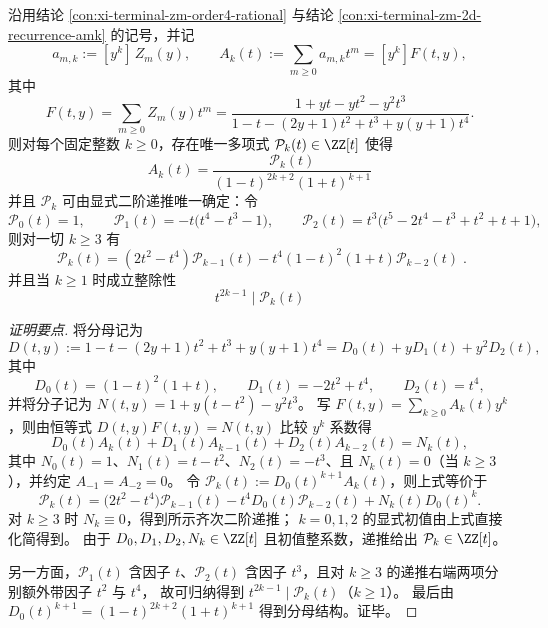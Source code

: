 
\begin{conclusion}\label{con:xi-terminal-zm-fixed-weight-generating-function-rigidity}
沿用结论 \ref{con:xi-terminal-zm-order4-rational} 与结论 \ref{con:xi-terminal-zm-2d-recurrence-amk} 的记号，并记
\[
a_{m,k}:=[y^k]\,Z_m(y),\qquad
A_k(t):=\sum_{m\ge 0}a_{m,k}t^m=[y^k]F(t,y),
\]
其中
\[
F(t,y)=\sum_{m\ge 0}Z_m(y)t^m
=\frac{1+yt-yt^2-y^2t^3}{1-t-(2y+1)t^2+t^3+y(y+1)t^4}.
\]
则对每个固定整数 \(k\ge 0\)，存在唯一多项式 \(\mathcal{P}_k(t)\in\ZZ[t]\) 使得
\[
\boxed{\;
A_k(t)=\frac{\mathcal{P}_k(t)}{(1-t)^{2k+2}(1+t)^{k+1}}\;}
\]
并且 \(\mathcal{P}_k\) 可由显式二阶递推唯一确定：令
\[
\mathcal{P}_0(t)=1,\qquad
\mathcal{P}_1(t)=-t\bigl(t^4-t^3-1\bigr),\qquad
\mathcal{P}_2(t)=t^3\bigl(t^5-2t^4-t^3+t^2+t+1\bigr),
\]
则对一切 \(k\ge 3\) 有
\[
\boxed{\;
\mathcal{P}_k(t)=(2t^2-t^4)\mathcal{P}_{k-1}(t)-t^4(1-t)^2(1+t)\mathcal{P}_{k-2}(t)\; }.
\]
并且当 \(k\ge 1\) 时成立整除性
\[
\boxed{\; t^{2k-1}\mid \mathcal{P}_k(t)\;}
\]
\end{conclusion}
\begin{proof}[证明要点]
将分母记为
\[
D(t,y):=1-t-(2y+1)t^2+t^3+y(y+1)t^4=D_0(t)+yD_1(t)+y^2D_2(t),
\]
其中
\[
D_0(t)=(1-t)^2(1+t),\qquad D_1(t)=-2t^2+t^4,\qquad D_2(t)=t^4,
\]
并将分子记为
\(
N(t,y)=1+y(t-t^2)-y^2t^3
\)。
写 \(F(t,y)=\sum_{k\ge 0}A_k(t)y^k\)，则由恒等式 \(D(t,y)F(t,y)=N(t,y)\) 比较 \(y^k\) 系数得
\[
D_0(t)A_k(t)+D_1(t)A_{k-1}(t)+D_2(t)A_{k-2}(t)=N_k(t),
\]
其中 \(N_0(t)=1\)、\(N_1(t)=t-t^2\)、\(N_2(t)=-t^3\)、且 \(N_k(t)=0\)（当 \(k\ge 3\)），并约定 \(A_{-1}=A_{-2}=0\)。
令 \(\mathcal{P}_k(t):=D_0(t)^{k+1}A_k(t)\)，则上式等价于
\[
\mathcal{P}_k(t)=\bigl(2t^2-t^4\bigr)\mathcal{P}_{k-1}(t)-t^4D_0(t)\mathcal{P}_{k-2}(t)+N_k(t)D_0(t)^k.
\]
对 \(k\ge 3\) 时 \(N_k\equiv 0\)，得到所示齐次二阶递推；
\(k=0,1,2\) 的显式初值由上式直接化简得到。
由于 \(D_0,D_1,D_2,N_k\in\ZZ[t]\) 且初值整系数，递推给出 \(\mathcal{P}_k\in\ZZ[t]\)。
\par
另一方面，\(\mathcal{P}_1(t)\) 含因子 \(t\)、\(\mathcal{P}_2(t)\) 含因子 \(t^3\)，且对 \(k\ge 3\) 的递推右端两项分别额外带因子 \(t^2\) 与 \(t^4\)，
故可归纳得到 \(t^{2k-1}\mid \mathcal{P}_k(t)\)（\(k\ge 1\)）。
最后由 \(D_0(t)^{k+1}=(1-t)^{2k+2}(1+t)^{k+1}\) 得到分母结构。证毕。
\end{proof}

